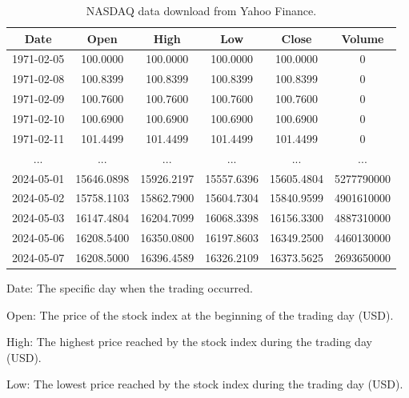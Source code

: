 \begin{table}[H]
	\caption{NASDAQ data download from Yahoo Finance.}
	\begin{tabular}{|c|c|c|c|c|c|}
		\hline
		\textbf{Date} & \textbf{Open} & \textbf{High} & \textbf{Low} & \textbf{Close} & \textbf{Volume} \\
		\hline
		1971-02-05    & 100.0000      & 100.0000      & 100.0000     & 100.0000       & 0               \\
		\hline
		1971-02-08    & 100.8399      & 100.8399      & 100.8399     & 100.8399       & 0               \\
		\hline
		1971-02-09    & 100.7600      & 100.7600      & 100.7600     & 100.7600       & 0               \\
		\hline
		1971-02-10    & 100.6900      & 100.6900      & 100.6900     & 100.6900       & 0               \\
		\hline
		1971-02-11    & 101.4499      & 101.4499      & 101.4499     & 101.4499       & 0               \\
		\hline
		...           & ...           & ...           & ...          & ...            & ...             \\
		\hline
		2024-05-01    & 15646.0898    & 15926.2197    & 15557.6396   & 15605.4804     & 5277790000      \\
		\hline
		2024-05-02    & 15758.1103    & 15862.7900    & 15604.7304   & 15840.9599     & 4901610000      \\
		\hline
		2024-05-03    & 16147.4804    & 16204.7099    & 16068.3398   & 16156.3300     & 4887310000      \\
		\hline
		2024-05-06    & 16208.5400    & 16350.0800    & 16197.8603   & 16349.2500     & 4460130000      \\
		\hline
		2024-05-07    & 16208.5000    & 16396.4589    & 16326.2109   & 16373.5625     & 2693650000      \\
		\hline
	\end{tabular}
	\label{tab:raw-data}
\end{table}

Date: The specific day when the trading occurred.

Open: The price of the stock index at the beginning of the trading day (USD).

High: The highest price reached by the stock index during the trading day (USD).

Low: The lowest price reached by the stock index during the trading day (USD).


